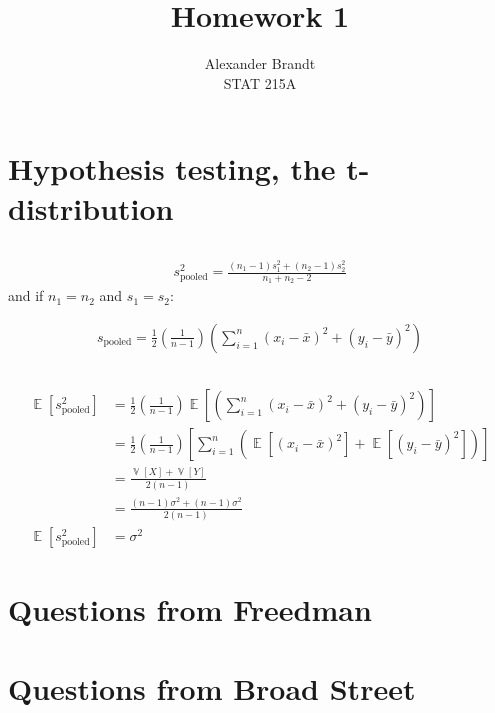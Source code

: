 \documentclass[12pt, oneside]{article}
\title{Homework 1}
\author{Alexander Brandt\\STAT 215A}
\DeclareMathOperator{\E}{\mathbb{E}}
\DeclareMathOperator{\V}{\mathbb{V}}
\begin{document}
\maketitle

\section{Hypothesis testing, the t-distribution}

\subsection{}

\begin{align*}
s_{\text{pooled}}^2 = \frac{(n_1 - 1)s_1^2 + (n_2 - 1)s_2^2}{n_1+n_2-2}
\end{align*}
and if \(n_1 = n_2\) and \(s_1 = s_2\):

\begin{align*}
s_{\text{pooled}} = \frac{1}{2}\left(\frac{1}{n-1} \right) \left( \sum_{i=1}^n (x_i - \bar x)^2 + (y_i - \bar y)^2 \right)
\end{align*}

\subsection{}

\begin{align*}
\E[s_{\text{pooled}}^2] 	&= \frac{1}{2}\left(\frac{1}{n-1} \right) \E\left[\left( \sum_{i=1}^n (x_i - \bar x)^2 + (y_i - \bar y)^2 \right)\right] \\
					&= \frac{1}{2}\left(\frac{1}{n-1} \right) \left[ \sum_{i=1}^{n} \left( \E \left[(x_i - \bar x)^2\right] +  \E \left[(y_i - \bar y)^2\right] \right) \right]\\
					&= \frac{\V[X] + \V[Y]}{2(n-1)}\\
					&= \frac{(n-1)\sigma^2 + (n-1)\sigma^2}{2(n-1)}\\
\E[s_{\text{pooled}}^2]	&= \sigma^2
\end{align*}

\subsection{}





\section{Questions from Freedman}

\section{Questions from Broad Street}
\end{document}

